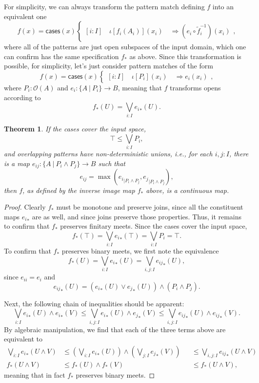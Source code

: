 \documentclass[conference]{IEEEtran}
\newtheorem{theorem}{Theorem}
\newcommand{\suchthat}{\ |\ }
\newcommand{\Open}[1]{\mathcal{O}({#1})}
\newcommand{\restrict}[2]{{#1}_{|{#2}}}
\newcommand{\oinclf}[1]{\iota[{#1}]}
\newcommand{\oincl}[2]{\oinclf{#1} \left({#2}\right)}
\newcommand{\Branch}{\Rightarrow}
\begin{document}
For simplicity, we can always transform the pattern match defining $f$ into an equivalent one
\[
f(x) = \mathsf{cases}(x)
\begin{cases}
[i : I] \quad \oincl{f_i(A_i)}{x_i} \quad \Branch (e_i \circ \tilde{f}_i^{-1})(x_i)
\end{cases},
\]
where all of the patterns are just open subspaces of the input domain, which one can confirm has the same specification $f_*$ as above. Since this transformation is possible, for simplicity, let's just consider pattern matches of the form
\[
f(x) = \mathsf{cases}(x)
\begin{cases}
[i : I] \quad \oincl{P_i}{x_i} \quad \Branch e_i(x_i)
\end{cases},
\]
where $P_i : \Open{A}$ and $e_i : \{ A \suchthat P_i \} \to B$, meaning that $f$ transforms opens according to
\[
f_*(U) = \bigvee_{i : I} {e_i}_*(U).
\]

\begin{theorem}
If the cases cover the input space,
\[
\top \le \bigvee_{i : I} P_i \tag{covering},
\]
and overlapping patterns have non-deterministic unions, i.e., for each $i, j : I$, there is a map $e_{ij} : \{A \suchthat P_i \wedge P_j \} \to B$ such that
\[
e_{ij} = \max( \restrict{e_i}{P_i \wedge P_j}, \restrict{e_j}{P_i \wedge P_j} ), \tag{gluing}
\]
then $f$, as defined by the inverse image map $f_*$ above, is a continuous map.
\end{theorem}
\begin{proof}
Clearly $f_*$ must be monotone and preserve joins, since all the constituent maps ${e_i}_*$ are as well, and since joins preserve those properties. Thus, it remains to confirm that $f_*$ preserves finitary meets.
Since the cases cover the input space,
\[
f_*(\top) = \bigvee_{i : I} {e_i}_*(\top) = \bigvee_{i : I}P_i = \top.
\]
To confirm that $f_*$ preserves binary meets, we first note the equivalence
\[
f_*(U) = \bigvee_{i : I} {e_i}_*(U) = \bigvee_{i, j : I} {e_{ij}}_*(U),
\]
since $e_{ii} = e_i$ and 
\[
{e_{ij}}_*(U) = \left( {e_i}_*(U) \vee {e_j}_*(U) \right) \wedge \left(P_i \wedge P_j \right).
\]

Next, the following chain of inequalities should be apparent:
\[
\bigvee_{i : I} {e_i}_*(U) \wedge {e_i}_*(V)
\le 
\bigvee_{i, j : I} {e_i}_*(U) \wedge {e_j}_*(V)
\le
\bigvee_{i, j : I} {e_{ij}}_*(U) \wedge {e_{ij}}_*(V).
\]
By algebraic manipulation, we find that each of the three terms above are equivalent to
\begin{align*}
\bigvee_{i : I} {e_i}_*(U \wedge V)
&\le 
\left(\bigvee_{i : I} {e_i}_*(U) \right) \wedge \left( \bigvee_{j: I} {e_j}_*(V) \right)
&&\le
\bigvee_{i, j : I} {e_{ij}}_*(U \wedge V)
\\
f_*(U \wedge V) 
&\le f_*(U) \wedge f_*(V)
&&\le f_*(U \wedge V),
\end{align*}
meaning that in fact $f_*$ preserves binary meets.
\end{proof}
\end{document}
